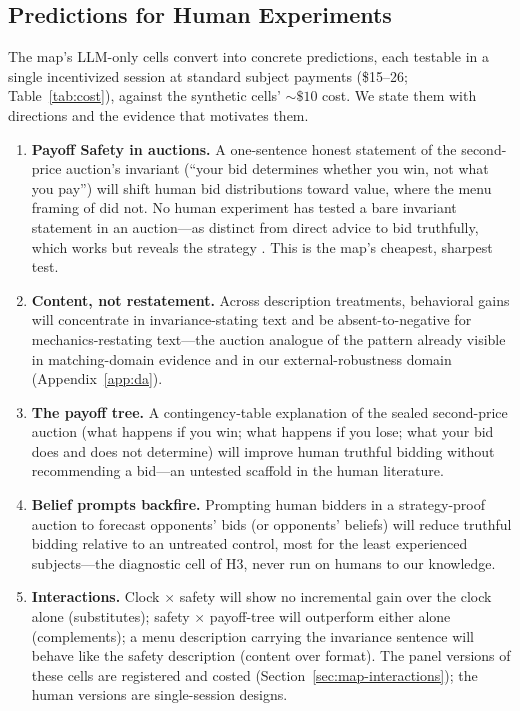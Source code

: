 \subsection{Predictions for Human Experiments}\label{sec:predictions}

The map's LLM-only cells convert into concrete predictions, each testable in a single incentivized session at standard subject payments (\$15--26; Table~\ref{tab:cost}), against the synthetic cells' $\sim\$10$ cost. We state them with directions and the evidence that motivates them.

\begin{enumerate}[leftmargin=1.6em, itemsep=2pt]
    \item \textbf{Payoff Safety in auctions.} A one-sentence honest statement of the second-price auction's invariant (``your bid determines whether you win, not what you pay'') will shift human bid distributions toward value, where the menu framing of \citet{gonczarowski2023strategyproofness} did not. No human experiment has tested a bare invariant statement in an auction---as distinct from direct advice to bid truthfully, which works but reveals the strategy \citep{masuda2022net}. This is the map's cheapest, sharpest test.
    \item \textbf{Content, not restatement.} Across description treatments, behavioral gains will concentrate in invariance-stating text and be absent-to-negative for mechanics-restating text---the auction analogue of the pattern already visible in matching-domain evidence \citep{gonczarowski2024describing, katuscak2024simpler, guillen2018effectiveness} and in our external-robustness domain (Appendix~\ref{app:da}).
    \item \textbf{The payoff tree.} A contingency-table explanation of the sealed second-price auction (what happens if you win; what happens if you lose; what your bid does and does not determine) will improve human truthful bidding without recommending a bid---an untested scaffold in the human literature.
    \item \textbf{Belief prompts backfire.} Prompting human bidders in a strategy-proof auction to forecast opponents' bids (or opponents' beliefs) will reduce truthful bidding relative to an untreated control, most for the least experienced subjects---the diagnostic cell of H3, never run on humans to our knowledge.
    \item \textbf{Interactions.} Clock $\times$ safety will show no incremental gain over the clock alone (substitutes); safety $\times$ payoff-tree will outperform either alone (complements); a menu description carrying the invariance sentence will behave like the safety description (content over format). The panel versions of these cells are registered and costed (Section~\ref{sec:map-interactions}); the human versions are single-session designs. 
\end{enumerate}

